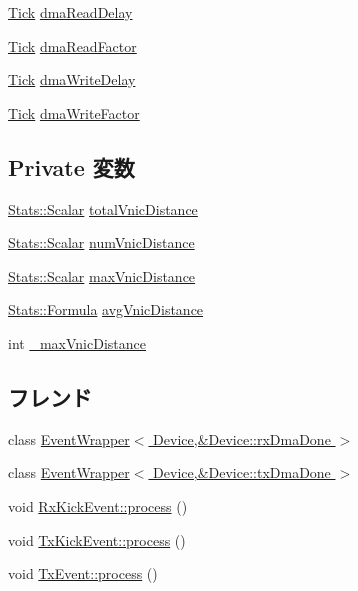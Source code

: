 \begin{DoxyCompactItemize}
\item 
\hyperlink{base_2types_8hh_a5c8ed81b7d238c9083e1037ba6d61643}{Tick} \hyperlink{classSinic_1_1Device_abff269bf1752a04839eb356b47d4348b}{dmaReadDelay}
\item 
\hyperlink{base_2types_8hh_a5c8ed81b7d238c9083e1037ba6d61643}{Tick} \hyperlink{classSinic_1_1Device_a632abfe8a89dfa1d944547874f1b4fe4}{dmaReadFactor}
\item 
\hyperlink{base_2types_8hh_a5c8ed81b7d238c9083e1037ba6d61643}{Tick} \hyperlink{classSinic_1_1Device_add556e09206ac9f4675d3e2da53339e8}{dmaWriteDelay}
\item 
\hyperlink{base_2types_8hh_a5c8ed81b7d238c9083e1037ba6d61643}{Tick} \hyperlink{classSinic_1_1Device_a396f950eb0d0a011cfa5790861e32608}{dmaWriteFactor}
\end{DoxyCompactItemize}
\subsection*{Private 変数}
\begin{DoxyCompactItemize}
\item 
\hyperlink{classStats_1_1Scalar}{Stats::Scalar} \hyperlink{classSinic_1_1Device_aceabe9d2fb5f87ee602c22e0d0141479}{totalVnicDistance}
\item 
\hyperlink{classStats_1_1Scalar}{Stats::Scalar} \hyperlink{classSinic_1_1Device_a489a76c8b17d7dec4865d06b211218fb}{numVnicDistance}
\item 
\hyperlink{classStats_1_1Scalar}{Stats::Scalar} \hyperlink{classSinic_1_1Device_a55159ce061f8632637c330b0b101d370}{maxVnicDistance}
\item 
\hyperlink{classStats_1_1Formula}{Stats::Formula} \hyperlink{classSinic_1_1Device_a6846633bb8f156a544f88825a26a3090}{avgVnicDistance}
\item 
int \hyperlink{classSinic_1_1Device_a3eb6949618cb5ab7fcb963974eb980a0}{\_\-maxVnicDistance}
\end{DoxyCompactItemize}
\subsection*{フレンド}
\begin{DoxyCompactItemize}
\item 
class \hyperlink{classSinic_1_1Device_aeca94de76c2e5173eca0cd628c06cb43}{EventWrapper$<$ Device,\&Device::rxDmaDone $>$}
\item 
class \hyperlink{classSinic_1_1Device_af2d0621641d94343bd091391cd6cf46f}{EventWrapper$<$ Device,\&Device::txDmaDone $>$}
\item 
void \hyperlink{classSinic_1_1Device_a97dc465a9dffe1cb8fcb2775d67610ca}{RxKickEvent::process} ()
\item 
void \hyperlink{classSinic_1_1Device_ab1e1e9de6b0b4cbeee1a4c0bb61e07d9}{TxKickEvent::process} ()
\item 
void \hyperlink{classSinic_1_1Device_ac669bd618effa3395173bc2905568d54}{TxEvent::process} ()
\end{DoxyCompactItemize}


